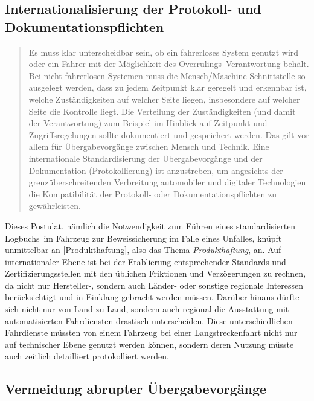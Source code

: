 \documentclass[twoside,a4paper,12pt]{article}
\begin{document}
\subsection{Internationalisierung der Protokoll- und Dokumentationspflichten} \label{InternationaleStandardisierungDerProtokollUndDokumentationspflichten}

\begin{quote}
\glqq
Es muss klar unterscheidbar sein, ob ein fahrerloses System genutzt wird oder ein Fahrer
mit der Möglichkeit des \glqq Overrulings\grqq\ Verantwortung behält. Bei nicht fahrerlosen Systemen muss die Mensch/Maschine-Schnittstelle 
so ausgelegt werden, dass zu jedem Zeitpunkt klar geregelt und erkennbar ist, welche Zuständigkeiten auf welcher Seite liegen,
insbesondere auf welcher Seite die Kontrolle liegt. Die Verteilung der Zuständigkeiten
(und damit der Verantwortung) zum Beispiel im Hinblick auf Zeitpunkt und Zugriffsregelungen sollte dokumentiert und gespeichert werden. 
Das gilt vor allem für Übergabevorgänge zwischen Mensch und Technik. Eine internationale Standardisierung der Übergabevorgänge 
und der Dokumentation (Protokollierung) ist anzustreben, um angesichts der
grenzüberschreitenden Verbreitung automobiler und digitaler Technologien die Kompatibilität der Protokoll- oder 
Dokumentationspflichten zu gewährleisten.\grqq\mbox{~\cite[S. 13]{ek}}
\end{quote}

Dieses Postulat, nämlich die Notwendigkeit zum Führen eines standardisierten \glqq Logbuchs\grqq\ im Fahrzeug zur Beweissicherung im Falle eines Unfalles, 
knüpft unmittelbar an \ref{Produkthaftung}, also das Thema \textit{Produkthaftung}, an. Auf internationaler Ebene ist bei der Etablierung entsprechender 
Standards und Zertifizierungsstellen mit den üblichen Friktionen und Verzögerungen zu rechnen, da nicht nur Hersteller-, sondern auch Länder- oder 
sonstige regionale Interessen berücksichtigt und in Einklang gebracht werden müssen. Darüber hinaus dürfte sich nicht nur von Land zu Land, sondern auch
regional die Ausstattung mit automatisierten Fahrdiensten drastisch unterscheiden. Diese unterschiedlichen Fahrdienste müssten von einem Fahrzeug bei einer
Langstreckenfahrt nicht nur auf technischer Ebene genutzt werden können, sondern deren Nutzung müsste auch zeitlich detailliert protokolliert werden.

\subsection{Vermeidung abrupter Übergabevorgänge} \label{VermeidungAbrupterUebergabevorgaenge}
\end{document}

